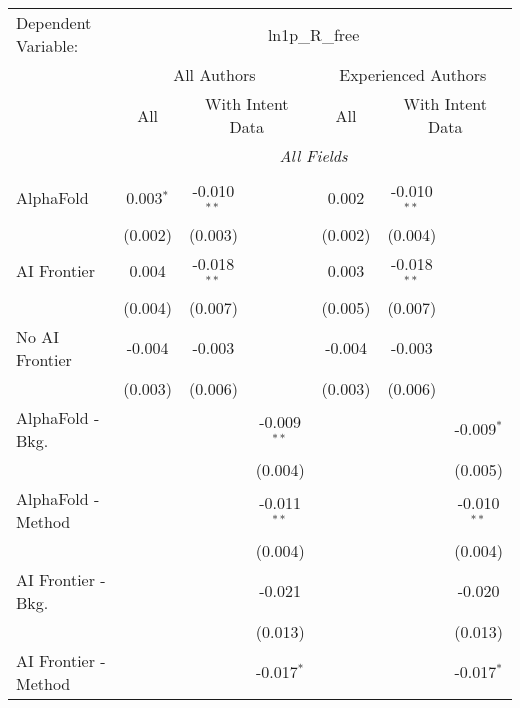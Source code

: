 \begingroup
\centering
\begin{tabular}{lcccccc}
   \tabularnewline \midrule \midrule
   Dependent Variable: & \multicolumn{6}{c}{ln1p\_R\_free}\\
 & \multicolumn{3}{c}{All Authors} & \multicolumn{3}{c}{Experienced Authors} \\
\cmidrule(lr){2-4} \cmidrule(lr){5-7}
 & \multicolumn{1}{c}{All} & \multicolumn{2}{c}{With Intent Data} & \multicolumn{1}{c}{All} & \multicolumn{2}{c}{With Intent Data} \\
\cmidrule(lr){2-2} \cmidrule(lr){3-4} \cmidrule(lr){5-5} \cmidrule(lr){6-7}
 & \multicolumn{6}{c}{\textit{All Fields}} \\ \\
   AlphaFold               & 0.003$^{*}$ & -0.010$^{**}$ &               & 0.002   & -0.010$^{**}$ &   \\   
                           & (0.002)     & (0.003)       &               & (0.002) & (0.004)       &   \\   
   AI Frontier             & 0.004       & -0.018$^{**}$ &               & 0.003   & -0.018$^{**}$ &   \\   
                           & (0.004)     & (0.007)       &               & (0.005) & (0.007)       &   \\   
   No AI Frontier          & -0.004      & -0.003        &               & -0.004  & -0.003        &   \\   
                           & (0.003)     & (0.006)       &               & (0.003) & (0.006)       &   \\   
   AlphaFold - Bkg.        &             &               & -0.009$^{**}$ &         &               & -0.009$^{*}$\\   
                           &             &               & (0.004)       &         &               & (0.005)\\   
   AlphaFold - Method      &             &               & -0.011$^{**}$ &         &               & -0.010$^{**}$\\   
                           &             &               & (0.004)       &         &               & (0.004)\\   
   AI Frontier - Bkg.      &             &               & -0.021        &         &               & -0.020\\   
                           &             &               & (0.013)       &         &               & (0.013)\\   
   AI Frontier - Method    &             &               & -0.017$^{*}$  &         &               & -0.017$^{*}$\\   

\end{tabular}
